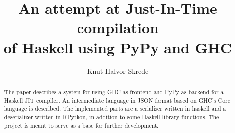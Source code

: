 \documentclass{article}
\begin{document}
\title{An attempt at Just-In-Time compilation\\of Haskell using PyPy and GHC}
\author{Knut Halvor Skrede}
\maketitle

\begin{abstract}
The paper describes a system for using GHC as frontend and PyPy as backend for a 
Haskell JIT compiler. An intermediate language in JSON format based on GHC's Core
language is described. The implemented parts are a serializer written in haskell and
a deserializer written in RPython, in addition to some Haskell library functions.
The project is meant to serve as a base for further development. 
\end{abstract}

\clearpage

\tableofcontents

\clearpage

\setlength\LTleft{0pt}
\setlength\LTright{0pt}






















\end{document}
